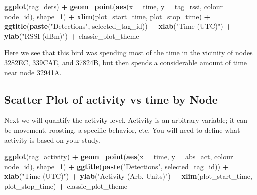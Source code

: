 \documentclass[
]{book}
\newenvironment{Shaded}{\begin{snugshade}}{\end{snugshade}}
\newcommand{\AttributeTok}[1]{\textcolor[rgb]{0.13,0.29,0.53}{#1}}
\newcommand{\DecValTok}[1]{\textcolor[rgb]{0.00,0.00,0.81}{#1}}
\newcommand{\FunctionTok}[1]{\textcolor[rgb]{0.13,0.29,0.53}{\textbf{#1}}}
\newcommand{\NormalTok}[1]{#1}
\newcommand{\SpecialCharTok}[1]{\textcolor[rgb]{0.81,0.36,0.00}{\textbf{#1}}}
\newcommand{\StringTok}[1]{\textcolor[rgb]{0.31,0.60,0.02}{#1}}
\begin{document}
\begin{Shaded}
\begin{Highlighting}[]
\FunctionTok{ggplot}\NormalTok{(tag\_dets) }\SpecialCharTok{+}
  \FunctionTok{geom\_point}\NormalTok{(}\FunctionTok{aes}\NormalTok{(}\AttributeTok{x =}\NormalTok{ time, }
                 \AttributeTok{y =}\NormalTok{ tag\_rssi, }
                 \AttributeTok{colour =}\NormalTok{ node\_id), }
             \AttributeTok{shape=}\DecValTok{1}\NormalTok{) }\SpecialCharTok{+}
  \FunctionTok{xlim}\NormalTok{(plot\_start\_time, plot\_stop\_time) }\SpecialCharTok{+}
  \FunctionTok{ggtitle}\NormalTok{(}\FunctionTok{paste}\NormalTok{(}\StringTok{"Detections"}\NormalTok{, selected\_tag\_id)) }\SpecialCharTok{+}
  \FunctionTok{xlab}\NormalTok{(}\StringTok{"Time (UTC)"}\NormalTok{) }\SpecialCharTok{+} 
  \FunctionTok{ylab}\NormalTok{(}\StringTok{"RSSI (dBm)"}\NormalTok{) }\SpecialCharTok{+}
\NormalTok{  classic\_plot\_theme}
\end{Highlighting}
\end{Shaded}

Here we see that this bird was spending most of the time in the vicinity of nodes 3282EC, 339CAE, and 37824B, but then spends a considerable amount of time near node 32941A.

\subsection{Scatter Plot of activity vs time by Node}\label{scatter-plot-of-activity-vs-time-by-node}

Next we will quantify the activity level. Activity is an arbitrary variable; it can be movement, roosting, a specific behavior, etc. You will need to define what activity is based on your study.

\begin{Shaded}
\begin{Highlighting}[]
\FunctionTok{ggplot}\NormalTok{(tag\_activity) }\SpecialCharTok{+}
  \FunctionTok{geom\_point}\NormalTok{(}\FunctionTok{aes}\NormalTok{(}\AttributeTok{x =}\NormalTok{ time, }
                 \AttributeTok{y =}\NormalTok{ abs\_act, }
                 \AttributeTok{colour =}\NormalTok{ node\_id), }
             \AttributeTok{shape=}\DecValTok{1}\NormalTok{) }\SpecialCharTok{+}
  \FunctionTok{ggtitle}\NormalTok{(}\FunctionTok{paste}\NormalTok{(}\StringTok{"Detections"}\NormalTok{, selected\_tag\_id)) }\SpecialCharTok{+}
  \FunctionTok{xlab}\NormalTok{(}\StringTok{"Time (UTC)"}\NormalTok{) }\SpecialCharTok{+}
  \FunctionTok{ylab}\NormalTok{(}\StringTok{"Activity (Arb. Units)"}\NormalTok{) }\SpecialCharTok{+}
  \FunctionTok{xlim}\NormalTok{(plot\_start\_time, plot\_stop\_time) }\SpecialCharTok{+}
\NormalTok{  classic\_plot\_theme}
\end{Highlighting}
\end{Shaded}
\end{document}
